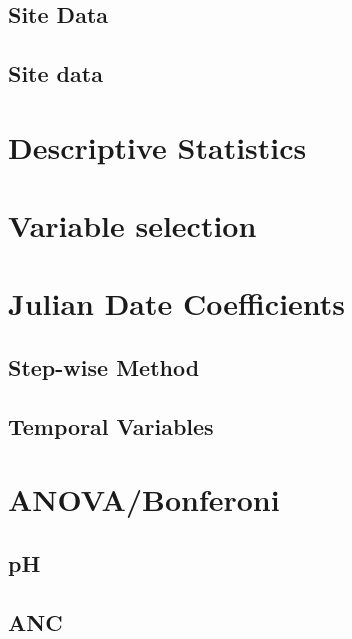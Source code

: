 \chapter{}

	\section{Site Data}
		

	\section{Site data}
		


\chapter{Descriptive Statistics}
	


\chapter{Variable selection}
	


\chapter{Julian Date Coefficients}
	\section{Step-wise Method}
		 

	\section{Temporal Variables}


\chapter{ANOVA/Bonferoni}\pagebreak
	\section{pH}\label{app:bon}
		
 
	\section{ANC}%
		

